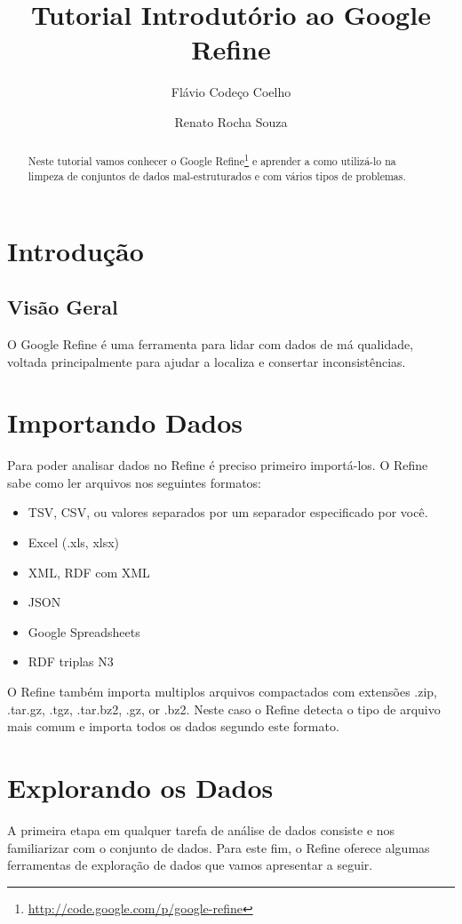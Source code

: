 \documentclass[a4paper,10pt]{report}
\title{Tutorial Introdutório ao Google Refine}
\author{Flávio Codeço Coelho \and Renato Rocha Souza}
\begin{document}
\maketitle

\begin{abstract}
Neste tutorial vamos conhecer o Google Refine\footnote{\url{http://code.google.com/p/google-refine}} e aprender a como utilizá-lo na limpeza de conjuntos de dados mal-estruturados e com vários tipos de problemas.
\end{abstract}
\tableofcontents
\chapter{Introdução}
\section{Visão Geral}
O Google Refine é uma ferramenta para lidar com dados de má qualidade, voltada principalmente para ajudar a localiza e consertar inconsistências.
\chapter{Importando Dados}
Para poder analisar dados no Refine é preciso primeiro importá-los. O Refine sabe como ler arquivos nos seguintes formatos:
\begin{itemize}
 \item     TSV, CSV, ou valores separados por um separador especificado por você.
\item Excel (.xls, xlsx)
 \item    XML, RDF com XML
 \item    JSON
 \item    Google Spreadsheets
 \item    RDF triplas N3 
\end{itemize}

O Refine também importa multiplos arquivos compactados com extensões .zip, .tar.gz, .tgz, .tar.bz2, .gz, or .bz2. Neste caso o Refine detecta o tipo de arquivo mais comum e importa todos os dados segundo este formato.

\chapter{Explorando os Dados}
A primeira etapa em qualquer tarefa de análise de dados consiste e nos familiarizar com o conjunto de dados. Para este fim, o Refine oferece algumas ferramentas de exploração de dados que vamos apresentar a seguir.
\end{document}
